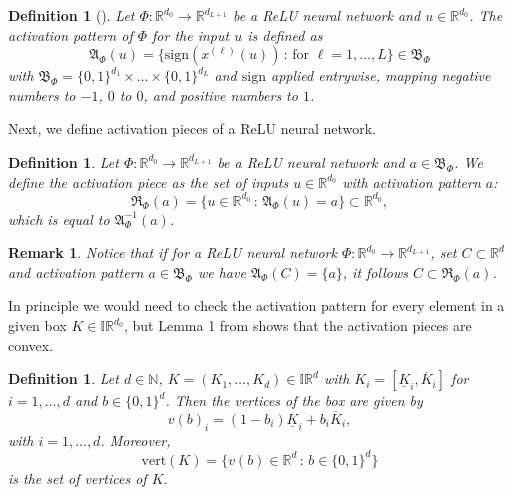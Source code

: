 \documentclass[a4paper, 11pt]{article}
\newtheorem{definition}[theorem]{Definition}
\newtheorem{remark}[theorem]{Remark}
\begin{document}
	
	\begin{definition}[\cite{hanin2019deep}]\label{def:ActiPattern}
		Let $\Phi: \mathbb{R}^{d_0} \to \mathbb{R}^{d_{L+1}}$ be a ReLU neural network and $u \in \mathbb{R}^{d_0}$. The activation pattern of $\Phi$ for the input $u$ is defined as
		\begin{equation*}
			\mathfrak{A}_\Phi(u) = \{ \mathrm{sign}(x^{(\ell)}(u)) \, : \, \text{for }\ell=1,\dotsc, L\} \in \mathfrak{B}_\Phi
		\end{equation*}
		with $\mathfrak{B}_\Phi=  \{0,1\}^{d_1} \times \dots \times \{0,1\}^{d_L}$ and $\mathrm{sign}$ applied entrywise, mapping negative numbers to $-1$, $0$ to $0$, and positive numbers to $1$.
	\end{definition}
	
	Next, we define activation pieces of a ReLU neural network.
	
	\begin{definition}\label{def:ActiPiece}
		Let $\Phi: \mathbb{R}^{d_0} \to \mathbb{R}^{d_{L+1}}$ be a ReLU neural network and $a \in \mathfrak{B}_\Phi$. We define the activation piece as the set of inputs $u\in \mathbb{R}^{d_0}$ with activation pattern $a$:
		\begin{equation*}
			\mathfrak{R}_\Phi(a) = \{ u \in \mathbb{R}^{d_0} \, : \, \mathfrak{A}_\Phi(u) = a\}\subset \mathbb{R}^{d_0},
		\end{equation*}
		which is equal to $\mathfrak{A}_\Phi^{-1}(a)$.
	\end{definition}
	
	\begin{remark}
		Notice that if for a ReLU neural network $\Phi: \mathbb{R}^{d_0} \to \mathbb{R}^{d_{L+1}}$, set $C \subset \mathbb{R}^d$ and activation pattern $a\in \mathfrak{B}_\Phi$ we have $\mathfrak{A}_\Phi(C) =\{a\}$, it follows $C\subset \mathfrak{R}_\Phi(a)$.
	\end{remark}
	
	In principle we would need to check the activation pattern for every element in a given box $K \in \mathbb{IR}^{d_0}$, but Lemma 1 from \cite{hanin2019deep} shows that the activation pieces are convex.
	
	\begin{definition}
		Let $d \in \mathbb{N}$, $K= (K_1, \dotsc, K_d)\in \mathbb{IR}^d$ with $K_i = [\underline{K}_i, \overline{K}_i]$ for $i=1,\dotsc,d$ and $b \in \{0,1\}^d$. Then the vertices of the box are given by
		$$ v(b)_i = (1- b_i) \underline{K}_i + b_i \overline{K}_i, $$
		with $i=1,\dotsc,d$. Moreover,
		$$ \mathrm{vert}(K)  = \{ v(b) \in \mathbb{R}^d \, : \, b \in \{0,1\}^d \} $$
		is the set of vertices of $K$.
	\end{definition}
	
\end{document}
